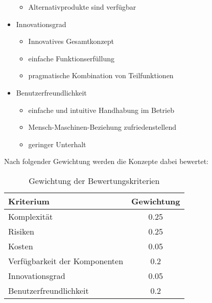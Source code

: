 \begin{itemize}
\begin{itemize}
	\item Alternativprodukte sind verfügbar
	\end{itemize}

	\item Innovationsgrad
	\begin{itemize}
	\item Innovatives Gesamtkonzept
	
	\item einfache Funktionserfüllung
	
	\item pragmatische Kombination von Teilfunktionen
	\end{itemize}

	\item Benutzerfreundlichkeit
	\begin{itemize}
	\item einfache und intuitive Handhabung im Betrieb	
		
	\item Mensch-Maschinen-Beziehung zufriedenstellend
	
	\item geringer Unterhalt
	
	\end{itemize}

\end{itemize}

Nach folgender Gewichtung werden die Konzepte dabei bewertet:
\begin{table}[H]
	\begin{tabular}{|l|c|}
	\hline 
	\textbf{Kriterium} & \textbf{Gewichtung} \\ 
	\hline 
	Komplexität & 0.25 \\ 
	\hline 
	Risiken & 0.25 \\ 
	\hline 
	Kosten & 0.05 \\ 
	\hline 
	Verfügbarkeit der Komponenten & 0.2 \\ 
	\hline 
	Innovationsgrad & 0.05 \\ 
	\hline 
	Benutzerfreundlichkeit & 0.2 \\ 
	\hline 
	\end{tabular} 
	\caption{Gewichtung der Bewertungskriterien}
	\label{tab:gewichtung}
\end{table}

